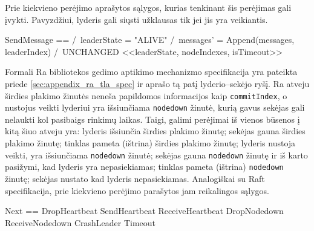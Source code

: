 \documentclass{VUMIFPSkursinis}
\begin{document}
Prie kiekvieno perėjimo aprašytos sąlygos, kurias tenkinant šis perėjimas gali įvykti. Pavyzdžiui, lyderis gali siųsti užklausas tik jei jis yra veikiantis.


\begin{adjustwidth}{2cm}{}

\begin{tla}
SendMessage == 
        /\ leaderState = "ALIVE"
        /\ messages' = Append(messages, leaderIndex)
        /\ UNCHANGED <<leaderState, nodeIndexes, isTimeout>>
\end{tla}
\begin{tlatex}
\@pvspace{8.0pt}%
%
%
\@pvspace{8.0pt}%
\end{tlatex}

\end{adjustwidth}


Formali Ra bibliotekos gedimo aptikimo mechanizmo specifikacija yra pateikta priede \ref{sec:appendix_ra_tla_spec} ir aprašo tą patį lyderio--sekėjo ryšį. Ra atveju širdies plakimo žinutės neneša papildomos informacijos kaip \texttt{commitIndex}, o nustojus veikti lyderiui yra išsiunčiama \texttt{nodedown} žinutė, kurią gavus sekėjas gali nelaukti kol pasibaigs rinkimų laikas. Taigi, galimi perėjimai iš vienos būsenos į kitą šiuo atveju yra: lyderis išsiunčia širdies plakimo žinutę; sekėjas gauna širdies plakimo žinutę; tinklas pameta (ištrina) širdies plakimo žinutę; lyderis nustoja veikti, yra išsiunčiama \texttt{nodedown} žinutė; sekėjas gauna \texttt{nodedown} žinutę ir iš karto pasižymi, kad lyderis yra nepasiekiamas; tinklas pameta (ištrina) \texttt{nodedown} žinutę; sekėjas nustato kad lyderis nepasiekiamas. Analogiškai su Raft specifikacija, prie kiekvieno perėjimo parašytos jam reikalingos sąlygos.

\begin{adjustwidth}{2cm}{}

\begin{tla}
Next == \/ DropHeartbeat
        \/ SendHeartbeat
        \/ ReceiveHeartbeat
        \/ DropNodedown
        \/ ReceiveNodedown
        \/ CrashLeader
        \/ Timeout
\end{tla}
\begin{tlatex}
\@pvspace{8.0pt}%
%
%
%
%
%
%
%
\@pvspace{8.0pt}%
\end{tlatex}


\end{adjustwidth}
\end{document}
